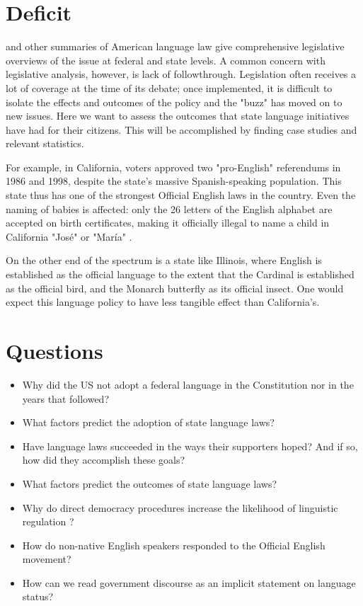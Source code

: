 \documentclass{article}
\begin{document}
\section*{Deficit}

\textcite{Baron92} and other summaries of American language law give
comprehensive legislative overviews of the issue at federal and state levels. A
common concern with legislative analysis, however, is lack of followthrough.
Legislation often receives a lot of coverage at the time of its debate; once
implemented, it is difficult to isolate the effects and outcomes of the policy
and the "buzz" has moved on to new issues. Here we want to assess the outcomes
that state language initiatives have had for their citizens. This will be
accomplished by finding case studies and relevant statistics.

For example, in California, voters approved two "pro-English" referendums in
1986 and 1998, despite the state's massive Spanish-speaking population. This
state thus has one of the strongest Official English laws in the country.  Even
the naming of babies is affected: only the 26 letters of the English alphabet
are accepted on birth certificates, making it officially illegal to name a child
in California "José" or "María" \parencite{Larson11}.

On the other end of the spectrum is a state like Illinois, where English is
established as the official language to the extent that the Cardinal is
established as the official bird, and the Monarch butterfly as its official
insect. One would expect this language policy to have less tangible effect than
California's.

\section*{Questions}

\begin{itemize}

\item Why did the US not adopt a federal language in the Constitution nor in the
  years that followed?
\item What factors predict the adoption of state language laws?
\item Have language laws succeeded in the ways their supporters hoped? And if so,
  how did they accomplish these goals?
\item What factors predict the outcomes of state language laws?
\item Why do direct democracy procedures increase the likelihood of linguistic
  regulation \parencite{Liu14}?
\item How do non-native English speakers responded to the Official English
  movement?
\item How can we read government discourse as an implicit statement on language
  status?

\end{itemize}
\end{document}
